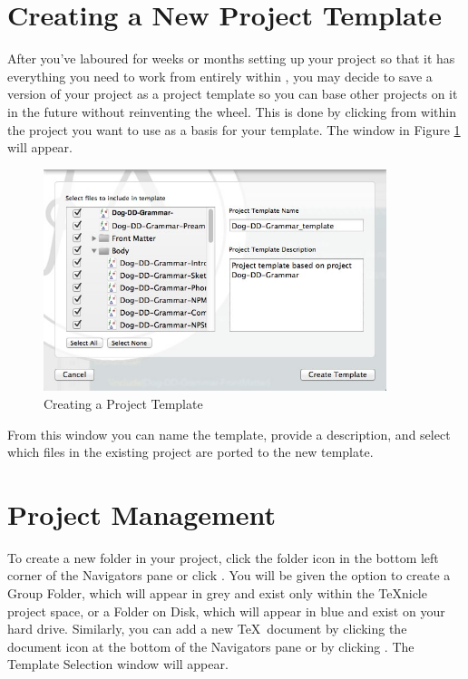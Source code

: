 \section[Creating Project Templates]{Creating a New \texnicle Project Template}
\label{reference.newtemplate}
After you've laboured for weeks or months setting up your project so that it has everything you need to work from entirely within \texnicle, you may decide to save a version of your project as a project template so you can base other projects on it in the future without reinventing the wheel. This is done by clicking  from within the project you want to use as a basis for your template. The window in Figure \ref{fig:texnicle-newtemplate} will appear.
\begin{figure}[htbp]
\caption{Creating a Project Template}
\label{fig:texnicle-newtemplate}
\centering
\includegraphics[width=10cm]{TeXnicle-Images/texnicle-newtemplate.jpg}
\end{figure}

From this window you can name the template, provide a description, and select which files in the existing project are ported to the new template.

\section{Project Management}
\label{reference.projectmanagement}
To create a new folder in your project, click the folder icon in the bottom left corner of the Navigators pane or click . You will be given the option to create a Group Folder, which will appear in grey and exist only within the TeXnicle project space, or a Folder on Disk, which will appear in blue and exist on your hard drive. Similarly, you can add a new \TeX\ document by clicking the document icon at the bottom of the Navigators pane or by clicking . The Template Selection window will appear.

